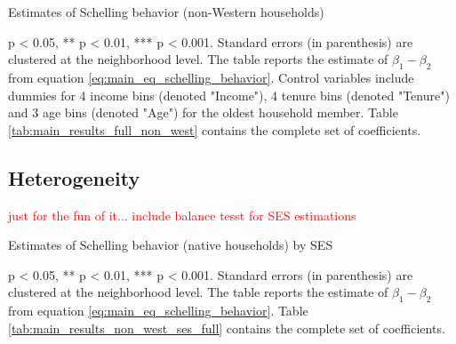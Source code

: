 \documentclass[../main.tex]{subfiles}
\begin{document}
\begin{table}[H]
    \caption{Estimates of Schelling behavior (non-Western households)}
    \label{tab:main_results_non_west}
    \begin{threeparttable}
            
    \begin{tablenotes}[flushleft]
    \item \scriptsize * p < 0.05, ** p < 0.01, *** p < 0.001. Standard errors (in parenthesis) are clustered at the neighborhood level. The table reports the estimate of $\beta_1 - \beta_2$ from equation \ref{eq:main_eq_schelling_behavior}. Control variables include dummies for 4 income bins (denoted "Income"), 4 tenure bins (denoted "Tenure") and 3 age bins (denoted "Age") for the oldest household member. Table \ref{tab:main_results_full_non_west} contains the complete set of coefficients.
    \end{tablenotes}
    \end{threeparttable}
\end{table}

\subsection{Heterogeneity}
\textcolor{red}{just for the fun of it... include balance tesst for SES estimations}
\begin{landscape}
\begin{table}
    \centering
    \caption{Estimates of Schelling behavior (native households) by SES}
    \label{tab:main_results_ses}
    \begin{threeparttable}
            
    \begin{tablenotes}[flushleft]
    \item \scriptsize * p < 0.05, ** p < 0.01, *** p < 0.001. Standard errors (in parenthesis) are clustered at the neighborhood level. The table reports the estimate of $\beta_1 - \beta_2$ from equation \ref{eq:main_eq_schelling_behavior}. Table \ref{tab:main_results_non_west_ses_full} contains the complete set of coefficients.
    \end{tablenotes}
    \end{threeparttable}
\end{table}
\end{landscape}
\end{document}
